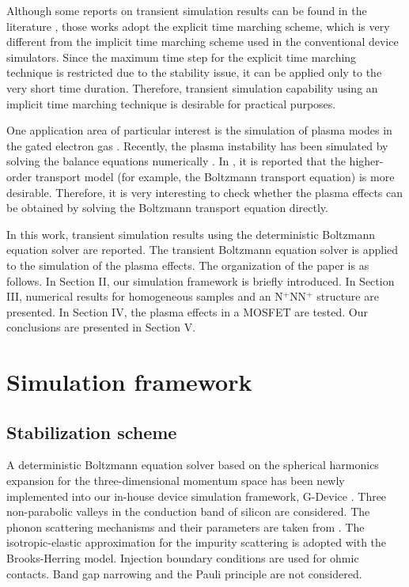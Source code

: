 \documentclass[journal]{IEEEtran}
\newcommand{\revision}[1]{{#1}}
\begin{document}
   Although some reports on transient simulation results can be found in the literature \cite{Koseki2016,Di2016}, those works adopt the explicit time marching scheme, which is very different from the implicit time marching scheme used in the conventional device simulators.
   Since the maximum time step for the explicit time marching technique is restricted due to the stability issue, it can be applied only to the very short time duration. 
   Therefore, transient simulation capability using an implicit time marching technique is desirable for practical purposes.

   One application area of particular interest is the simulation of plasma modes in the gated electron gas \cite{Dyakonov1993}.
   Recently, the plasma instability has been simulated by solving the balance equations numerically \cite{Hong2015}.
   In \cite{Kargar2016}, it is reported that the higher-order transport model (for example, the Boltzmann transport equation) is more desirable.
   Therefore, it is very interesting to check whether the plasma effects can be obtained by solving the Boltzmann transport equation directly.

   In this work, transient simulation results using the deterministic Boltzmann equation solver are reported.
   The transient Boltzmann equation solver is applied to the simulation of the plasma effects.
   The organization of the paper is as follows. 
   In Section II, our simulation framework is briefly introduced.   
   In Section III, numerical results for homogeneous samples and an N$^+$NN$^+$ structure are presented.  
   In Section IV, the plasma effects in a MOSFET are tested.
   Our conclusions are presented in Section V. 


\section{Simulation framework}

\subsection{Stabilization scheme}

   A deterministic Boltzmann equation solver based on the spherical harmonics expansion for the three-dimensional momentum space has been newly implemented into our in-house device simulation framework, G-Device \cite{Hong2015}.
   Three non-parabolic valleys in the conduction band of silicon are considered.
   The phonon scattering mechanisms and their parameters are taken from \cite{Hong2011}.
   The isotropic-elastic approximation for the impurity scattering is adopted with the Brooks-Herring model.
\revision{Injection boundary conditions \cite{Hong2009,Hong2011} are used for ohmic contacts.}
   Band gap narrowing and the Pauli principle are not considered.
   
\end{document}
